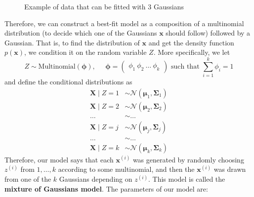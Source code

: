 \begin{figure}[H]
    \caption{Example of data that can be fitted with 3 Gaussians}
  \end{figure}

  Therefore, we can construct a best-fit model as a composition of a multinomial distribution (to decide which one of the Gaussians $\mathbf{x}$ should follow) followed by a Gaussian. That is, to find the distribution of $\mathbf{x}$ and get the density function $p(\mathbf{x})$, we condition it on the random variable $Z$. More specifically, we let
  \begin{equation}
    Z \sim \text{Multinomial}(\boldsymbol{\phi}), \;\;\;\;\; \boldsymbol{\phi} = \begin{pmatrix} \phi_1 \ \phi_2 \ \ldots \ \phi_k \end{pmatrix} \text{ such that } \sum_{i=1}^k \phi_i = 1
  \end{equation}
  and define the conditional distributions as
  \begin{align*}
    \mathbf{X} \mid Z = 1 & \sim \mathcal{N}(\boldsymbol{\mu}_1, \boldsymbol{\Sigma}_1) \\
    \mathbf{X} \mid Z = 2 & \sim \mathcal{N}(\boldsymbol{\mu}_2, \boldsymbol{\Sigma}_2) \\
    \ldots & \sim \ldots \\
    \mathbf{X} \mid Z = j & \sim \mathcal{N}(\boldsymbol{\mu}_j, \boldsymbol{\Sigma}_j) \\
    \ldots & \sim \ldots \\
    \mathbf{X} \mid Z = k & \sim \mathcal{N}(\boldsymbol{\mu}_k, \boldsymbol{\Sigma}_k)
  \end{align*}
  Therefore, our model says that each $\mathbf{x}^{(i)}$ was generated by randomly choosing $z^{(i)}$ from ${1, \ldots, k}$ according to some multinomial, and then the $\mathbf{x}^{(i)}$ was drawn from one of the $k$ Gaussians depending on $z^{(i)}$. This model is called the \textbf{mixture of Gaussians model}. The parameters of our model are: 

